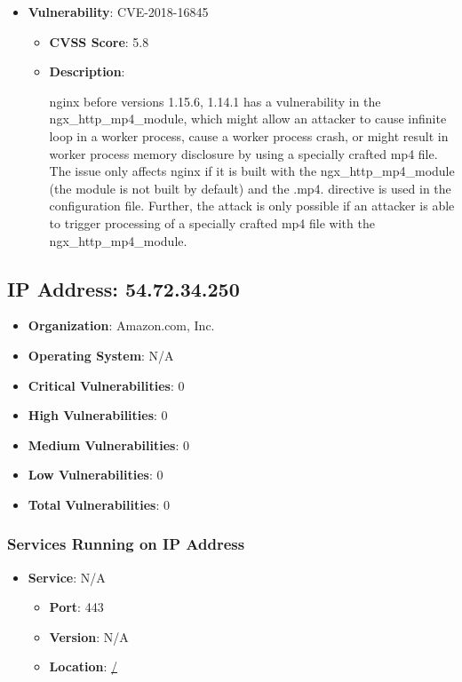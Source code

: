 \documentclass{article}
\begin{document}
\begin{itemize}
        \item \textbf{Vulnerability}: CVE-2018-16845
        \begin{itemize}
            \item \textbf{CVSS Score}:  5.8 
            \item \textbf{Description}:
            \parbox[t]{0.9\linewidth}{
                \ttfamily nginx before versions 1.15.6, 1.14.1 has a vulnerability in the ngx\_http\_mp4\_module, which might allow an attacker to cause infinite loop in a worker process, cause a worker process crash, or might result in worker process memory disclosure by using a specially crafted mp4 file. The issue only affects nginx if it is built with the ngx\_http\_mp4\_module (the module is not built by default) and the .mp4. directive is used in the configuration file. Further, the attack is only possible if an attacker is able to trigger processing of a specially crafted mp4 file with the ngx\_http\_mp4\_module.
            }
        \end{itemize}
    
\end{itemize}




\clearpage



\subsection*{IP Address: 54.72.34.250}

\begin{itemize}
    \item \textbf{Organization}: Amazon.com, Inc.
    \item \textbf{Operating System}:  N/A 
    \item \textbf{Critical Vulnerabilities}: 0
    \item \textbf{High Vulnerabilities}: 0
    \item \textbf{Medium Vulnerabilities}: 0
    \item \textbf{Low Vulnerabilities}: 0
    \item \textbf{Total Vulnerabilities}: 0
\end{itemize}

\subsubsection*{Services Running on IP Address}

\begin{itemize}
    
        \item \textbf{Service}: N/A
        \begin{itemize}
            \item \textbf{Port}: 443
            \item \textbf{Version}:  N/A 
            \item \textbf{Location}: \href{ / }{ / }
        \end{itemize}
    
\end{itemize}
\end{document}

